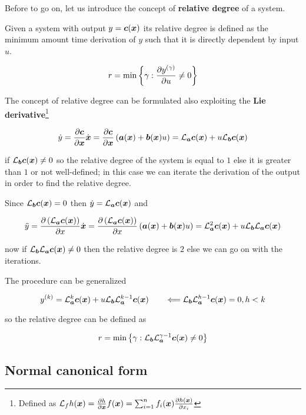 Before to go on, let us introduce the concept of \textbf{relative degree} of a system.

Given a system with output $y=\vect c(\x)$ its relative degree is defined as the minimum amount time derivation of $y$ such that it is directly dependent by input $u$.

\[
    r = \min \left\{ \gamma : \pd{y^{(\gamma)}}{u} \neq 0 \right\}
\]

The concept of relative degree can be formulated also exploiting the \textbf{Lie derivative}\footnote{Defined as $\Lie{f} h(\x) = \pd{h}{\x} f(\x) = \sum_{i=1}^{n} f_i(\x) \pd{h(\x)}{x_i}$}

\[
    \dot y =
    \pd{\vect c}{\x} \dx =
    \pd{\vect c}{\x} \left(\vect a(\x) + \vect b(\x) u\right) =
    \Lie{\vect a} \vect c(\x) + u \Lie{\vect b} \vect c(\x)
\]

if $\Lie{\vect b} \vect c(\x) \neq 0$ so the relative degree of the system is equal to $1$ else it is greater than $1$ or not well-defined;
in this case we can iterate the derivation of the output in order to find the relative degree.

Since $\Lie{\vect b} \vect c(\x) = 0$ then $\dot y = \Lie{\vect a} \vect c(\x)$ and

\[
    \ddot y =
    \pd{\left( \Lie{\vect a} \vect c(\x) \right)}{x} \dx =
    \pd{\left( \Lie{\vect a} \vect c(\x) \right)}{x} \left(\vect a(\x) + \vect b(\x) u\right) =
    \Lie{\vect a}^2 \vect c(\x) + u \Lie{\vect b} \Lie{\vect a} \vect c(\x)
\]

now if $\Lie{\vect b} \Lie{\vect a} \vect c(\x) \neq 0$ then the relative degree is $2$ else we can go on with the iterations.

The procedure can be generalized

\begin{equation}\label{eqn:output-via-lie}
    y^{(k)} = \Lie{\vect a}^k \vect c(\x) + u \Lie{\vect b} \Lie{\vect a}^{k-1} \vect c(\x) \qquad \Longleftarrow \Lie{\vect b} \Lie{\vect a}^{h-1} \vect c(\x) = 0, h < k
\end{equation}

so the relative degree can be defined as

\[
    r = \min \left\{ \gamma : \Lie{\vect b} \Lie{\vect a}^{\gamma-1} \vect c(\x) \neq 0 \right\}
\]

\subsection{Normal canonical form}

